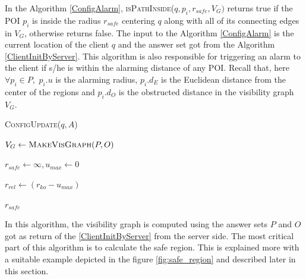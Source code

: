 \documentclass{sig-alternate}
\begin{document}
In the Algorithm \ref{ConfigAlarm}, \textsc{isPathInside}($q, p_i, r_{safe}, V_G)$ returns true if the POI $p_i$ is inside the radius $r_{safe}$ centering $q$ along with all of its connecting edges in $V_G$, otherwise returns false.
The input to the Algorithm \ref{ConfigAlarm} is the current location of the client $q$ and the answer set got from the Algorithm \ref{ClientInitByServer}. This algorithm is also responsible for triggering an alarm to the client if s/he is within the alarming distance of any POI. Recall that, here $\forall p_i \in P,$ $p_i.u$ is the alarming radius, $p_i.d_E$ is the Euclidean distance from the center of the regions and $p_i.d_O$ is the obstructed distance in the visibility graph $V_G$.
\begin{algorithm}
\caption{\textsc{ConfigUpdate}($q, A$)}
\label{ConfigAlarm}

    
     $V_G \gets \textsc{MakeVisGraph}(P, O)$ \;
    
     $r_{safe} \gets \infty, u_{max} \gets 0$ \;
    
     $r_{rel} \gets (r_{ko} - u_{max})$ \;
    
    \Return $r_{safe}$

\end{algorithm}

In this algorithm, the visibility graph is computed using the answer sets $P$ and $O$ got as return of the \ref{ClientInitByServer} from the server side. The most critical part of this algorithm is to calculate the safe region. This is explained more with a suitable example depicted in the figure \ref{fig:safe_region} and described later in this section.
\end{document}
